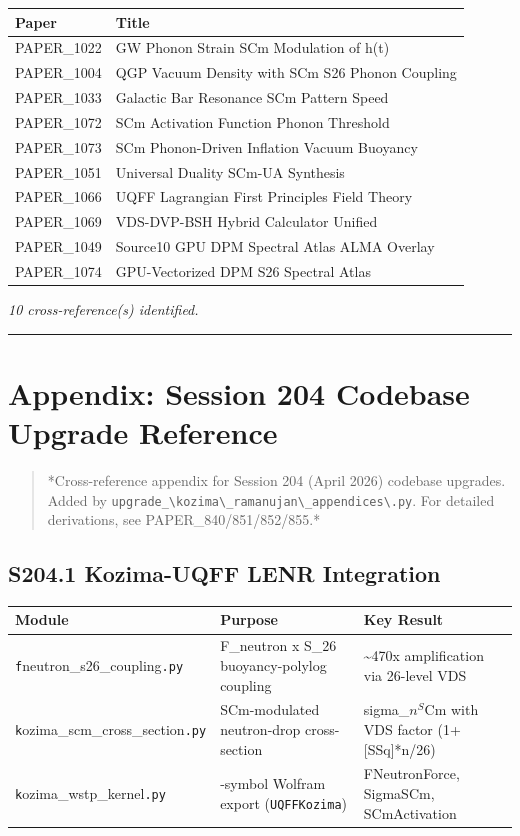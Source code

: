 \documentclass[12pt,a4paper]{article}
\begin{document}
\begin{table}[H]
\centering
\small
\begin{tabularx}{\linewidth}{@{}>{\raggedright\arraybackslash}X>{\raggedright\arraybackslash}X@{}}
\toprule
Paper & Title \tabularnewline
\midrule
PAPER\_1022 & GW Phonon Strain SCm Modulation of h(t) \tabularnewline
PAPER\_1004 & QGP Vacuum Density with SCm S26 Phonon Coupling \tabularnewline
PAPER\_1033 & Galactic Bar Resonance SCm Pattern Speed \tabularnewline
PAPER\_1072 & SCm Activation Function Phonon Threshold \tabularnewline
PAPER\_1073 & SCm Phonon-Driven Inflation Vacuum Buoyancy \tabularnewline
PAPER\_1051 & Universal Duality SCm-UA Synthesis \tabularnewline
PAPER\_1066 & UQFF Lagrangian First Principles Field Theory \tabularnewline
PAPER\_1069 & VDS-DVP-BSH Hybrid Calculator Unified \tabularnewline
PAPER\_1049 & Source10 GPU DPM Spectral Atlas ALMA Overlay \tabularnewline
PAPER\_1074 & GPU-Vectorized DPM S26 Spectral Atlas \tabularnewline
\bottomrule
\end{tabularx}
\end{table}

\emph{10 cross-reference(s) identified.}

\medskip\hrule\medskip

\section{Appendix: Session 204 Codebase Upgrade Reference}

\begin{quote}
*Cross-reference appendix for Session 204 (April 2026) codebase upgrades.
Added by \texttt{upgrade\_\textbackslash {kozima\textbackslash \_ramanujan\textbackslash \_appendices\textbackslash }.py}. For detailed derivations,
see PAPER\_840/851/852/855.*
\end{quote}

\subsection{S204.1 Kozima-UQFF LENR Integration}

\begin{table}[H]
\centering
\small
\begin{tabularx}{\linewidth}{@{}>{\raggedright\arraybackslash}X>{\raggedright\arraybackslash}X>{\raggedright\arraybackslash}X@{}}
\toprule
Module & Purpose & Key Result \tabularnewline
\midrule
\texttt{f}neutron\_{s26\_coupling}\texttt{.py} & F\_neutron x S\_26 buoyancy-polylog coupling & \textasciitilde{}470x amplification via 26-level VDS \tabularnewline
\texttt{k}ozima\_{scm\_cross\_section}\texttt{.py} & SCm-modulated neutron-drop cross-section & sigma\_$n^{S}$Cm with VDS factor (1+[SSq]*n/26) \tabularnewline
\texttt{k}ozima\_{wstp\_kernel}\texttt{.py} & 11-symbol Wolfram export (\texttt{UQFFKozima}) & FNeutronForce, SigmaSCm, SCmActivation \tabularnewline
\bottomrule
\end{tabularx}
\end{table}
\end{document}
